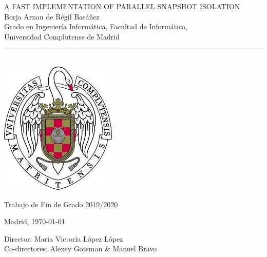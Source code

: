 \newpage
\thispagestyle{empty}
\begin{center}
   \vspace{1cm}
   {\Large A FAST IMPLEMENTATION OF PARALLEL SNAPSHOT ISOLATION}\\
   \vspace{0.5cm}
   \vspace{0.5cm}
   {\large Borja Arnau de Régil Basáñez}\\
   \vspace{0.5cm}
   Grado en Ingeniería Informática, Facultad de Informática,\\
   Universidad Complutense de Madrid \\
   \vspace{0.65cm}
   \rule{2in}{0.5pt}\\
   \vspace{0.85cm}
   \includegraphics[height=2.5in]{figures/escudo.jpg}

   \vspace{0.5cm}
   Trabajo de Fin de Grado 2019/2020
   \vspace{0.5cm}

     Madrid, \today\\
   \vspace{1cm}
\end{center}

{\raggedleft
   \vspace{1cm}
   Director: Maria Victoria López López\\
   Co-directores: Alexey Gotsman \& Manuel Bravo\\
}
